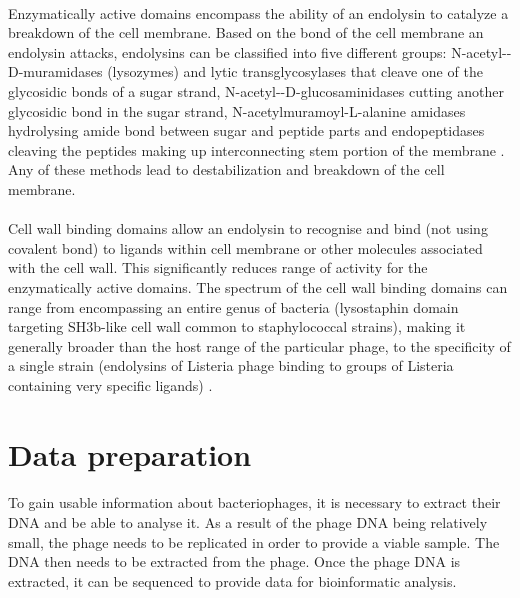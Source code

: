 \paragraph*{}
Enzymatically active domains encompass the ability of an endolysin to catalyze a breakdown of the cell membrane. Based on the bond of the cell membrane an endolysin attacks, endolysins can be classified into five different groups: N-acetyl-\textbeta-D-muramidases (lysozymes) and lytic transglycosylases that cleave one of the glycosidic bonds of a sugar strand, N-acetyl-\textbeta-D-glucosaminidases cutting another glycosidic bond in the sugar strand, N-acetylmuramoyl-L-alanine amidases hydrolysing amide bond between sugar and peptide parts and endopeptidases cleaving the peptides making up interconnecting stem portion of the membrane \cite{schmelcher2012bacteriophage}. Any of these methods lead to destabilization and breakdown of the cell membrane.
\paragraph*{}
Cell wall binding domains allow an endolysin to recognise and bind (not using covalent bond) to ligands within cell membrane or other molecules associated with the cell wall. This significantly reduces range of activity for the enzymatically active domains. The spectrum of the cell wall binding domains can range from encompassing an entire genus of bacteria (lysostaphin domain targeting SH3b-like cell wall common to staphylococcal strains), making it generally broader than the host range of the particular phage, to the specificity of a single strain (endolysins of Listeria phage binding to groups of Listeria containing very specific ligands) \cite{schmelcher2012bacteriophage}.

\section{Data preparation}
\paragraph*{}
To gain usable information about bacteriophages, it is necessary to extract their DNA and be able to analyse it. As a result of the phage DNA being relatively small, the phage needs to be replicated in order to provide a viable sample. The DNA then needs to be extracted from the phage. Once the phage DNA is extracted, it can be sequenced to provide data for bioinformatic analysis. 

